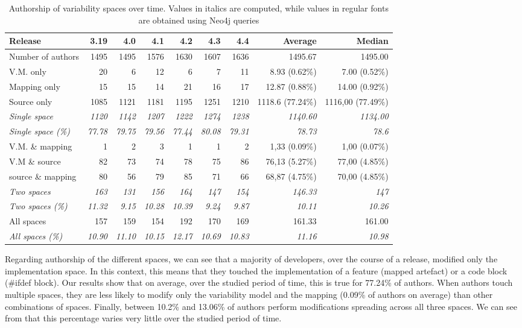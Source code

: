 \begin{table}[h]
{\vspace{5mm}
\begin{adjustbox}{max width=\textwidth}
\begin{tabular}{|l|r|r|r|r|r|r||r|r|}
\hline
Release	 			& 3.19 & 4.0 & 4.1 & 4.2 & 4.3 & 4.4 & Average & Median \\
\hline
Number of authors	&1495	&1495	&1576	&1630	&1607	&1636 & 1495.67 & 1495.00 \\
\hline
V.M. only			&20	&6	&12	&6	&7	&11	 & 8.93 (0.62\%) & 7.00 (0.52\%)\\
Mapping only 		&15	&15	&14	&21	&16	&17 & 12.87 (0.88\%) & 14.00 (0.92\%)\\
Source only 			&1085	&1121	&1181	&1195	&1251	&1210 & 1118.6 (77.24\%)& 1116,00	(77.49\%)\\
\emph{Single space}	&\emph{1120	}&\emph{1142}&\emph{1207	}&\emph{1222	}&\emph{1274	}&\emph{1238	} & \emph{1140.60} & \emph{1134.00}\\
\emph{Single space (\%)}	&\emph{77.78	}&\emph{79.75}	&\emph{79.56	}&\emph{77.44}&\emph{80.08}&\emph{79.31} & \emph{78.73} & \emph{78.6} \\
\hline
V.M. \& mapping 		&1	&2	&3	&1	&1	&2	& 1,33 (0.09\%)& 1,00 (0.07\%)\\
V.M \&  source		&82	&73	&74	&78	&75	&86	& 76,13 (5.27\%)& 77,00 (4.85\%)\\
source \& mapping	&80	&56	&79	&85	&71	&66	& 68,87 (4.75\%) & 70,00 (4.85\%)\\
\emph{Two spaces	}&\emph{163}	&\emph{131}	&\emph{156	}&\emph{164	}&\emph{147	}&\emph{154	} & \emph{146.33} & \emph{147} \\
\emph{Two spaces (\%)}	&\emph{11.32}	&\emph{9.15}	&\emph{10.28}	&\emph{10.39}	&\emph{9.24}	&\emph{9.87} & \emph{10.11} & \emph{10.26} \\
\hline
All spaces 			&157	&159	&154&192	&170	&169	 & 161.33 & 161.00\\
\emph{All spaces (\%)}&\emph{10.90}	&\emph{11.10}	&\emph{10.15}	&\emph{12.17}	&\emph{10.69}	&\emph{10.83} &\emph{11.16} & \emph{10.98}\\
\hline
\end{tabular}
\end{adjustbox}
}
\caption{Authorship of variability spaces over time. Values in italics are computed, while values in regular fonts are obtained using Neo4j queries}
\label{feature_authors}
\end{table}

Regarding authorship of the different spaces, we can see that a majority of developers, over the course of a release, modified only the implementation space.
In this context, this means that they touched the implementation of a feature (mapped artefact) or a code block (\#ifdef block).
Our results show that on average, over the studied period of time,  this is true for 77.24\% of authors.
When authors touch multiple spaces, they are less likely to modify only the variability model and the mapping (0.09\% of authors on average) than other combinations of spaces.
Finally, between 10.2\% and 13.06\% of authors perform modifications spreading across all three spaces.
We can see from  that this percentage varies very little over the studied period of time.

